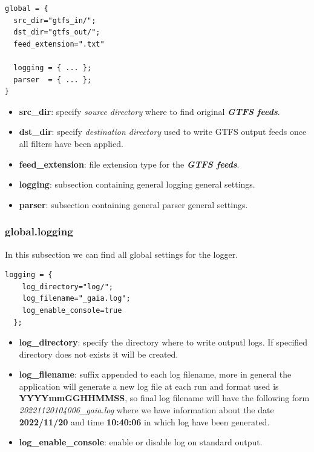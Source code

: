 \documentclass[12pt, a4paper]{book}
\begin{document}
\begin{small}
\begin{lstlisting}[backgroundcolor=\color{gray},frame=single]
global = {
  src_dir="gtfs_in/";
  dst_dir="gtfs_out/";
  feed_extension=".txt"
 
  logging = { ... };
  parser  = { ... };
}
\end{lstlisting}  
\end{small}

\begin{itemize}
\item \textbf{src\_dir}: specify \textit{source directory} where to find original \textbf{\textit{GTFS feeds}}.
\item \textbf{dst\_dir}: specify \textit{destination directory} used to write GTFS output feeds once all filters have been applied.
\item \textbf{feed\_extension}: file extension type for the \textbf{\textit{GTFS feeds}}.
\item \textbf{logging}: subsection containing general logging general settings.
\item \textbf{parser}: subsection containing general parser general settings.
\end{itemize}

\newpage
\subsubsection{global.logging}

In this subsection we can find all global settings for the logger.

\begin{small}
\begin{lstlisting}[backgroundcolor=\color{gray},frame=single]
  logging = {
    log_directory="log/";
    log_filename="_gaia.log";
    log_enable_console=true  
  };
\end{lstlisting} 
\end{small} 
\begin{itemize}
\item \textbf{log\_directory}: specify the directory where to write outputl logs. 
If specified directory does not exists it will be created.  
\item \textbf{log\_filename}: suffix appended to each log filename, more in general the\newline 
application will generate a new log file at each run and format used \newline
is \textbf{YYYYmmGGHHMMSS}, so final log filename will have the following\newline
form \textit{20221120104006\_gaia.log} where we have information about the\newline 
date \textbf{2022/11/20} and time \textbf{10:40:06} in which log have been generated.
\item \textbf{log\_enable\_console}: enable or disable log on standard output.
\end{itemize}
\end{document}
